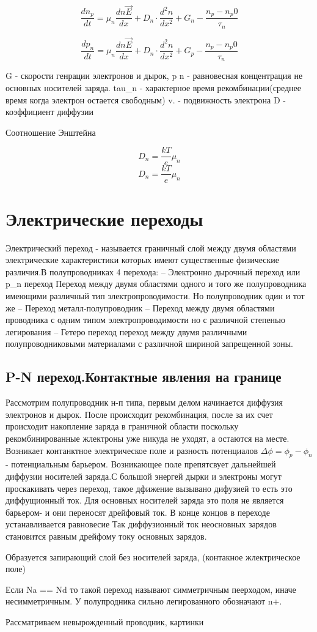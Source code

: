 \documentclass[../main.tex]{subfiles}
\begin{document}
\[\frac{d n_p}{d t} = \mu_n \frac{d n \vec E}{dx} + D_n \cdot \frac{d^2 n}{dx^2}+ G_n - \frac{n_p - n_p0}{\tau_n}\]

\[\frac{d p_n}{d t} = \mu_n \frac{d n \vec E}{dx} + D_n \cdot \frac{d^2 n}{dx^2}+ G_p - \frac{n_p - n_p0}{\tau_n}\]

G - скорости генрации электронов и дырок, p n - равновесная концентрация не основных носителей заряда. tau_n - характерное время рекомбинации(среднее время когда электрон остается свободным)
v. - подвижность электрона D - коэффициент диффузии

Соотношение Энштейна

\[D_n = \frac{kT}{e} \mu_n\]
\[D_n = \frac{kT}{e} \mu_n\]

\section{Электрические переходы}

Электрический переход - называется граничный слой между двумя областями электрические характеристики которых имеют существенные физические различия.В полупроводниках 4 перехода:
-- Электронно дырочный переход или p_n переход
Переход между двумя областями одного и того же полупроводника имеющими различный тип электропроводимости. Но полупроводник один и тот же
-- Переход металл-полупроводник
-- Переход между двумя областями проводника с одним типом электропроводимости но с различной степенью легирования
-- Гетеро переход переход между двумя различными полупроводниковыми материалами с различной шириной запрещенной зоны.

\subsection{P-N переход.Контактные явления на границе}

Рассмотрим полупроводник н-п типа, первым делом начинается диффузия электронов и дырок. После происходит рекомбинация, после за их счет происходит 
накопление заряда в граничной области поскольку рекомбинированные жлектроны уже никуда не уходят, а остаются на месте.
Возникает контанктное электрическое поле и разность потенциалов $\Delta \phi = \phi_p - \phi_n$ - потенциальным барьером.
Возникающее поле препятсвует дальнейшей диффузии носителей заряда.С большой энергей дырки и электроны могут проскакивать через переход, такое дфижение вызывано дифузией то есть это диффущионный ток.
Для основных носителей заряда это поля не является барьером- и они переносят дрейфовый ток. В конце концов в переходе устанавливается равновесие
Так диффузионный ток неосновных зарядов становится равным дрейфому току основных зарядов.

Образуется запирающий слой без носителей заряда, (контакное жлектрическое поле)

Если Na == Nd то такой переход называют симметричным пеерходом, иначе несимметричным. 
У полупродника сильно легированного обозначают n+.

Рассматриваем невырожденный проводник, картинки 
\end{document}
